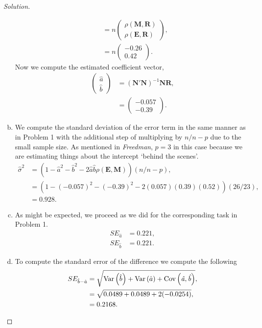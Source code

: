 \documentclass{amsart}
\DeclareMathOperator{\var}{\rm Var}
\newcommand{\bvec}[1]{{\boldsymbol #1}}
\begin{document}
\begin{proof}[Solution]
\begin{enumerate}[(a)]
\begin{align*}
							&= n \begin{pmatrix}
								\rho(\bvec{M}, \bvec{R}) \\ \rho(\bvec{E}, \bvec{R})
							\end{pmatrix}, \\
							&= n \begin{pmatrix}
								-0.26 \\ 0.42
							\end{pmatrix}.
						\end{align*}
					Now we compute the estimated coefficient vector,
						\begin{align*}
							\begin{pmatrix} \hat{a} \\ \hat{b} \end{pmatrix} &= (\bvec{N}'\bvec{N})^{-1}\bvec{N}\bvec{R}, \\
							&= \begin{pmatrix}
								-0.057 \\ -0.39
							\end{pmatrix}.
						\end{align*}
					\item We compute the standard deviation of the error term in the same manner as in Problem 1 with the additional step of multiplying by $n/n-p$ due to the small sample size.
					As mentioned in \textit{Freedman}, $p = 3$ in this case because we are estimating things about the intercept `behind the scenes'.
						\begin{align*}
							\hat{\sigma}^{2} &= \left(1 - \hat{a}^{2} - \hat{b}^{2} - 2\hat{a}\hat{b}\rho(\bvec{E},\bvec{M})\right)(n/n-p), \\
							&= \left(1 - (-0.057)^{2} - (-0.39)^{2} - 2(0.057)(0.39)(0.52)\right)(26/23), \\
							&= 0.928.
						\end{align*}
					\item As might be expected, we proceed as we did for the corresponding task in Problem 1.
						\begin{align*}
							SE_{\hat{a}} &= 0.221, \\
							SE_{\hat{b}} &= 0.221.
						\end{align*}
					\item To compute the standard error of the difference we compute the following
						\begin{align*}
						 	SE_{\hat{b}-\hat{a}} &= \sqrt{\var\left( \hat{b} \right) + \var\left( \hat{a} \right) + \rm Cov\left(\it \hat{a},\hat{b}\right)}, \\
						 	&= \sqrt{0.0489 + 0.0489 + 2(-0.0254)}, \\
						 	&= 0.2168.
						 \end{align*} 
				\end{enumerate}
			\end{proof}
\end{document}
